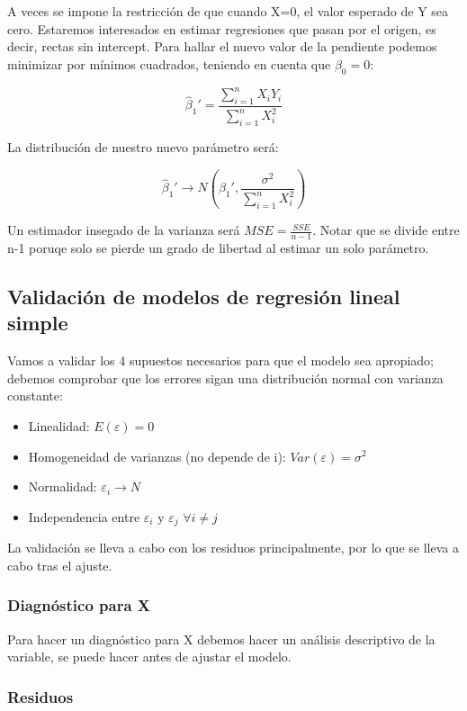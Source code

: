 A veces se impone la restricción de que cuando X=0, el valor esperado de Y sea cero. Estaremos interesados en estimar regresiones que pasan por el origen, es decir, rectas sin intercept. Para hallar el nuevo valor de la pendiente podemos minimizar por mínimos cuadrados, teniendo en cuenta que $\beta_0=0$:

$$
\hat\beta_1'=\frac{\displaystyle\sum_{i=1}^{n}X_iY_i}{\displaystyle\sum_{i=1}^{n}X^2_i}
$$

La distribución de nuestro nuevo parámetro será:

$$
\hat\beta_1'\longrightarrow N\left(\beta_1',\frac{\sigma^2}{\displaystyle\sum_{i=1}^{n}X_i^2}\right)
$$

Un estimador insegado de la varianza será $MSE=\frac{SSE}{n-1}$. Notar que se divide entre n-1 poruqe solo se pierde un grado de libertad al estimar un solo parámetro.

\subsection{Validación de modelos de regresión lineal simple}

Vamos a validar los 4 supuestos necesarios para que el modelo sea apropiado; debemos comprobar que los errores sigan una distribución normal con varianza constante:

\begin{itemize}
    \item Linealidad: $E(\varepsilon)=0$
    \item Homogeneidad de varianzas (no depende de i): $Var(\varepsilon)=\sigma^2$
    \item Normalidad: $\varepsilon_i\rightarrow N$
    \item Independencia entre $\varepsilon_i$ y $\varepsilon_j$ $\forall i\neq j$
\end{itemize}

La validación se lleva a cabo con los residuos principalmente, por lo que se lleva a cabo tras el ajuste.

\subsubsection{Diagnóstico para X}

Para hacer un diagnóstico para X debemos hacer un análisis descriptivo de la variable, se puede hacer antes de ajustar el modelo.

\subsubsection{Residuos}

